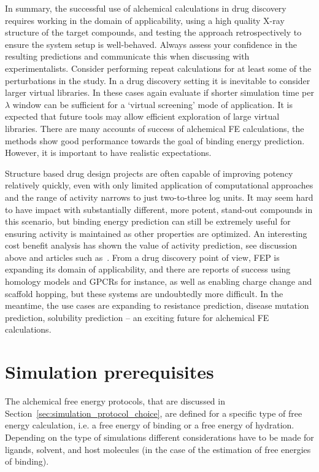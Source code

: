 \documentclass[9pt,bestpractices]{livecoms}
\begin{document}
In summary, the successful use of alchemical calculations in drug discovery requires working in the domain of applicability, using a high quality X-ray structure of the target compounds, and testing the approach retrospectively to ensure the system setup is well-behaved. Always assess your confidence in the resulting predictions and communicate this when discussing with experimentalists. Consider performing repeat calculations for at least some of the perturbations in the study. In a drug discovery setting it is inevitable to consider larger virtual libraries. In these cases again evaluate if shorter simulation time per $\lambda$ window can be sufficient for a ‘virtual screening’ mode of application. It is expected that future tools may allow efficient exploration of large virtual libraries. There are many accounts of success of alchemical FE calculations, the methods show good performance towards the goal of binding energy prediction. However, it is important to have realistic expectations. 

Structure based drug design projects are often capable of improving potency relatively quickly, even with only limited application of computational approaches and the range of activity narrows to just two-to-three log units. It may seem hard to have impact with substantially different, more potent, stand-out compounds in this scenario, but binding energy prediction can still be extremely useful for ensuring activity is maintained as other properties are optimized. An interesting cost benefit analysis has shown the value of activity prediction, see discussion above and articles such as~\cite{mobley2012perspectiv}. From a drug discovery point of view, FEP is expanding its domain of applicability, and there are reports of success using homology models and GPCRs for instance, as well as enabling charge change and scaffold hopping, but these systems are undoubtedly more difficult.  In the meantime, the use cases are expanding to resistance prediction, disease mutation prediction, solubility prediction – an exciting future for alchemical FE calculations. 
%
%
%
%
\section{Simulation prerequisites}
\label{sec:prerequisites}
The alchemical free energy protocols, that are discussed in Section~\ref{sec:simulation_protocol_choice}, are defined for a specific type of free energy calculation, i.e. a free energy of binding or a free energy of hydration. Depending on the type of simulations different considerations have to be made for ligands, solvent, and host molecules (in the case of the estimation of free energies of binding).
\end{document}
